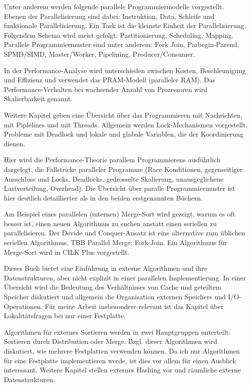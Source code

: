 \documentclass[a4paper,12pt,twoside]{article}
\begin{document}
Unter anderem werden folgende parallele Programmiermodelle vorgestellt. Ebenen der Parallelisierung sind dabei: Instruktion, Data, Schleife und funktionale Parallelisierung. Ein Task ist die kleinste Einheit der Parallelisierung. Folgendem Schema wird meist  gefolgt: Partitionierung, Scheduling, Mapping. Parallele Programmiermuster sind unter anderem: Fork Join, Parbegin-Parend, SPMD/SIMD, Master/Worker, Pipelining, Producer/Consumer.

In der Performance-Analyse wird unterschieden zwischen Kosten, Beschleunigung und Effizienz und verwendet das PRAM-Modell (paralleler RAM). Das Performance-Verhalten bei wachsender Anzahl von Prozessoren wird Skalierbarkeit genannt.

Weitere Kapitel geben eine Übersicht über das Programmieren mit Nachrichten, mit Piplelines und mit Threads. Allgemein werden Lock-Mechanismen vorgestellt, Probleme mit Deadlock und lokale und glabale Variablen, die der Koordinierung dienen.

\textbf{}

Hier wird die Performance-Theorie parallem Programmierens ausführlich dargelegt, die Fallstricke paralleler Programme (Race Konditionen, gegenseitiger Ausschluss und Locks, Deadlocks, gedrosselte Skalierung, unausgeglichene Lastverteilung, Overhead). Die Übersicht über paralle Programmiermuster ist hier deutlich detaillierter als in den beiden erstgenannten Büchern.

Am Beispiel eines parallelen (internen) Merge-Sort wird gezeigt, warum es oft besser ist, einen neuen Algorithmus zu suchen anstatt einen seriellen zu parallelisieren. Der Devide und Conquer-Ansatz ist eine alternative zum üblichen seriellen Algorithmus. TBB Parallel Merge: Fork-Join. Ein Algorithmus für Merge-Sort wird in CILK Plus vorgestellt. 

\textbf{}

Dieses Buch bietet eine Einführung in externe Algorithmen und ihre Datenstrukturen, aber nicht explizit in einer parallelen Implementierung. In einer Übersicht wird die Bedeutung des Verhältnisses von Cache und geteiltem Speicher diskutiert und allgemein die Organisation externen Speichers und I/O-Operationen. Für meine Arbeit insbesondere relevant ist das Kapitel über Lokalitätsfragen bei nur einer Festplatte. 

Algorithmen für externes Sortieren werden in zwei Hauptgruppen unterteilt: Sortieren durch Distribution oder Merge. Bzgl. dieser Algorithmen wird diskutiert, wie mehrere Festplatten verwenden können. Da ich nur Algorithmen für eine Festplatte implementieren werde, ist dies vor allem für einen Ausblick interessant. Weitere Kapitel stellen externes Hashing vor und räumliche externe Datenstrukturen.
\end{document}
